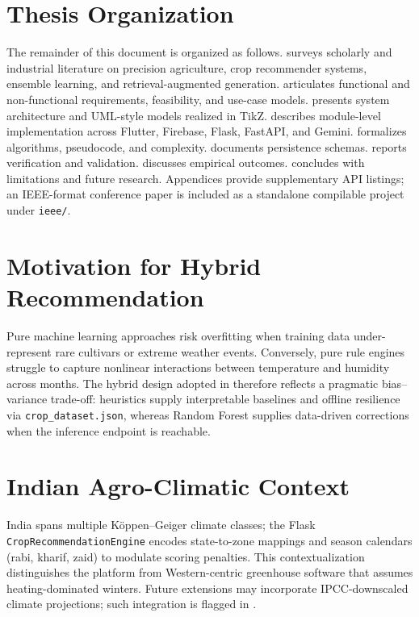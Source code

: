 \section{Thesis Organization}
\label{sec:organization}

The remainder of this document is organized as follows.  surveys scholarly and industrial literature on precision agriculture, crop recommender systems, ensemble learning, and retrieval-augmented generation.  articulates functional and non-functional requirements, feasibility, and use-case models.  presents system architecture and UML-style models realized in TikZ.  describes module-level implementation across Flutter, Firebase, Flask, FastAPI, and Gemini.  formalizes algorithms, pseudocode, and complexity.  documents persistence schemas.  reports verification and validation.  discusses empirical outcomes.  concludes with limitations and future research. Appendices provide supplementary API listings; an IEEE-format conference paper is included as a standalone compilable project under \texttt{ieee/}.

\section{Motivation for Hybrid Recommendation}
\label{sec:motivation_hybrid}

Pure machine learning approaches risk overfitting when training data under-represent rare cultivars or extreme weather events. Conversely, pure rule engines struggle to capture nonlinear interactions between temperature and humidity across months. The hybrid design adopted in \HydroSmart{} therefore reflects a pragmatic bias--variance trade-off: heuristics supply interpretable baselines and offline resilience via \texttt{crop\_dataset.json}, whereas Random Forest supplies data-driven corrections when the inference endpoint is reachable.

\section{Indian Agro-Climatic Context}
\label{sec:indian_context}

India spans multiple Köppen--Geiger climate classes; the Flask \texttt{CropRecommendationEngine} encodes state-to-zone mappings and season calendars (rabi, kharif, zaid) to modulate scoring penalties. This contextualization distinguishes the platform from Western-centric greenhouse software that assumes heating-dominated winters. Future extensions may incorporate IPCC-downscaled climate projections; such integration is flagged in .

